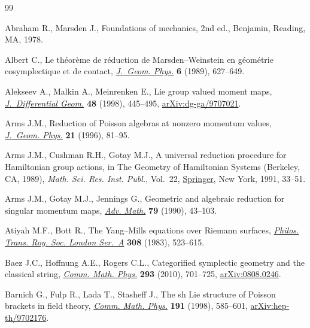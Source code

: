 \begin{thebibliography}{99}
\footnotesize\itemsep=0pt

Abraham R., Marsden J., Foundations of mechanics, 2nd ed., Benjamin, Reading,
  MA, 1978.

Albert C., Le th\'eor\`eme de r\'eduction de {M}arsden--{W}einstein en
  g\'eom\'etrie cosymplectique et de contact, \href{https://doi.org/10.1016/0393-0440(89)90029-6}{\textit{J.~Geom. Phys.}}
  \textbf{6} (1989), 627--649.

Alekseev A., Malkin A., Meinrenken E., Lie group valued moment maps,
  \href{https://doi.org/10.4310/jdg/1214460860}{\textit{J.~Differential Geom.}} \textbf{48} (1998), 445--495,
  \href{https://arxiv.org/abs/dg-ga/9707021}{arXiv:dg-ga/9707021}.

Arms J.M., Reduction of {P}oisson algebras at nonzero momentum values,
  \href{https://doi.org/10.1016/S0393-0440(96)00009-5}{\textit{J.~Geom. Phys.}} \textbf{21} (1996), 81--95.

Arms J.M., Cushman R.H., Gotay M.J., A universal reduction procedure for
  {H}amiltonian group actions, in The Geometry of {H}amiltonian Systems
  ({B}erkeley, {CA}, 1989), \textit{Math. Sci. Res. Inst. Publ.}, Vol.~22,
  \href{https://doi.org/10.1007/978-1-4613-9725-0_4}{Springer}, New York, 1991, 33--51.

Arms J.M., Gotay M.J., Jennings G., Geometric and algebraic reduction for
  singular momentum maps, \href{https://doi.org/10.1016/0001-8708(90)90058-U}{\textit{Adv. Math.}} \textbf{79} (1990), 43--103.

Atiyah M.F., Bott R., The {Y}ang--{M}ills equations over {R}iemann surfaces,
  \href{https://doi.org/10.1098/rsta.1983.0017}{\textit{Philos. Trans. Roy. Soc. London Ser.~A}} \textbf{308} (1983),
  523--615.

Baez J.C., Hoffnung A.E., Rogers C.L., Categorified symplectic geometry and the
  classical string, \href{https://doi.org/10.1007/s00220-009-0951-9}{\textit{Comm. Math. Phys.}} \textbf{293} (2010), 701--725,
  \href{https://arxiv.org/abs/0808.0246}{arXiv:0808.0246}.

Barnich G., Fulp R., Lada T., Stasheff J., The sh {L}ie structure of {P}oisson
  brackets in field theory, \href{https://doi.org/10.1007/s002200050278}{\textit{Comm. Math. Phys.}} \textbf{191} (1998),
  585--601, \href{https://arxiv.org/abs/hep-th/9702176}{arXiv:hep-th/9702176}.


\end{thebibliography}
